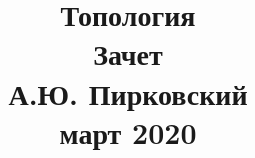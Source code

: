 \documentclass[fleqn]{article}
\title{Топология \\ Зачет \\ А.Ю. Пирковский \\ март 2020}
\begin{document}
	\maketitle
	\pagebreak
	
	
	\tableofcontents
	
	\newpage
	
			
\end{document}
